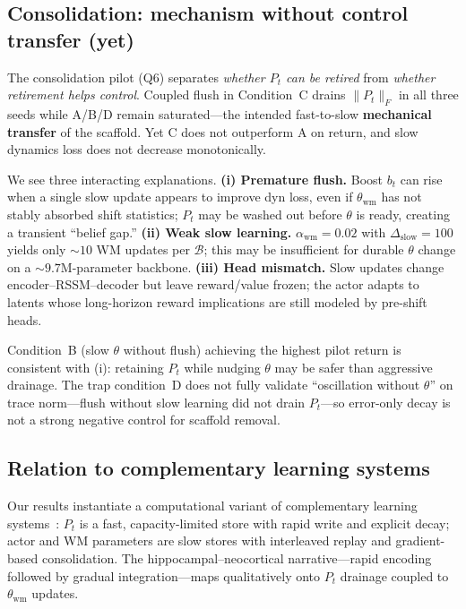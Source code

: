 \subsection{Consolidation: mechanism without control transfer (yet)}
\label{sec:disc-consolidation}

The consolidation pilot (Q6) separates \emph{whether $P_t$ can be retired} from \emph{whether retirement helps control}.
Coupled flush in Condition~C drains $\|P_t\|_F$ in all three seeds while A/B/D remain saturated---the intended fast-to-slow \textbf{mechanical transfer} of the scaffold.
Yet C does not outperform A on return, and slow dynamics loss does not decrease monotonically.

We see three interacting explanations.
\textbf{(i) Premature flush.} Boost $b_t$ can rise when a single slow update appears to improve dyn loss, even if $\theta_{\mathrm{wm}}$ has not stably absorbed shift statistics; $P_t$ may be washed out before $\theta$ is ready, creating a transient ``belief gap.''
\textbf{(ii) Weak slow learning.} $\alpha_{\mathrm{wm}}{=}0.02$ with $\Delta_{\mathrm{slow}}{=}100$ yields only ${\sim}10$ WM updates per $\mathcal{B}$; this may be insufficient for durable $\theta$ change on a ${\sim}9.7$M-parameter backbone.
\textbf{(iii) Head mismatch.} Slow updates change encoder--RSSM--decoder but leave reward/value frozen; the actor adapts to latents whose long-horizon reward implications are still modeled by pre-shift heads.

Condition~B (slow $\theta$ without flush) achieving the highest pilot return is consistent with (i): retaining $P_t$ while nudging $\theta$ may be safer than aggressive drainage.
The trap condition~D does not fully validate ``oscillation without $\theta$'' on trace norm---flush without slow learning did not drain $P_t$---so error-only decay is not a strong negative control for scaffold removal.

\subsection{Relation to complementary learning systems}
\label{sec:disc-cls}

Our results instantiate a computational variant of complementary learning systems~\cite{mcclelland1995complementary}:
$P_t$ is a fast, capacity-limited store with rapid write and explicit decay;
actor and WM parameters are slow stores with interleaved replay and gradient-based consolidation.
The hippocampal--neocortical narrative---rapid encoding followed by gradual integration---maps qualitatively onto $P_t$ drainage coupled to $\theta_{\mathrm{wm}}$ updates.

